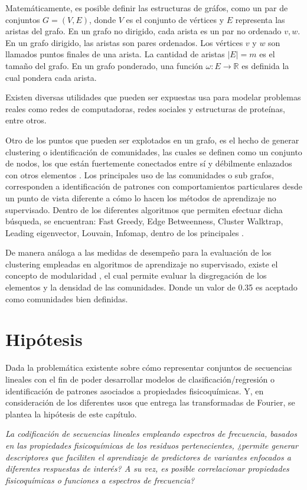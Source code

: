 Matemáticamente, es posible definir las estructuras de gráfos, como un par de conjuntos $G =(V,E)$, donde $V$ es el conjunto de vértices y  $E$ representa las aristas del grafo. En un grafo no dirigido, cada arista es un par no ordenado ${v,w}$. En un grafo dirigido, las aristas son pares ordenados. Los vértices $v$ y $w$ son llamados puntos finales de una arista. La cantidad de aristas $|E|=m$ es el tamaño del grafo. En un grafo ponderado, una función $\omega: E \rightarrow \mathbb{R}$ es definida la cual pondera cada arista.

Existen diversas utilidades que pueden ser expuestas usa para modelar problemas reales como redes de computadoras, redes sociales y estructuras de proteínas, entre otros. 

Otro de los puntos que pueden ser explotados en un grafo, es el hecho de generar clustering o identificación de comunidades, las cuales se definen como un conjunto de nodos, los que están fuertemente conectados entre sí y débilmente enlazados con otros elementos \cite{fortunato2012community}. Los principales uso de las comunidades o sub grafos, corresponden a identificación de patrones con comportamientos particulares desde un punto de vista diferente a cómo lo hacen los métodos de aprendizaje no supervisado. Dentro de los diferentes algoritmos que permiten efectuar dicha búsqueda, se encuentran: Fast Greedy, Edge Betweenness, Cluster Walktrap, Leading eigenvector, Louvain, Infomap, dentro de los principales \cite{newman2004detecting}.
 
De manera análoga a las medidas de desempeño para la evaluación de los clustering empleadas en algoritmos de aprendizaje no supervisado, existe el concepto de modularidad \cite{Newman8577}, el cual permite evaluar la disgregación de los elementos y la densidad de las comunidades. Donde un valor de 0.35 es aceptado como comunidades bien definidas.

\section{Hipótesis}

Dada la problemática existente sobre cómo representar conjuntos de secuencias lineales con el fin de poder desarrollar modelos de clasificación/regresión o identificación de patrones asociados a propiedades fisicoquímicas. Y, en consideración de los diferentes usos que entrega las transformadas de Fourier, se plantea la hipótesis de este capítulo.

\begin{center}
	\textit{La codificación de secuencias lineales empleando espectros de frecuencia, basados en las propiedades fisicoquímicas de los residuos pertenecientes, ¿permite generar descriptores que faciliten el aprendizaje de predictores de variantes enfocados a diferentes respuestas de interés? A su vez, es posible correlacionar propiedades fisicoquímicas o funciones a espectros de frecuencia?
}
\end{center}

